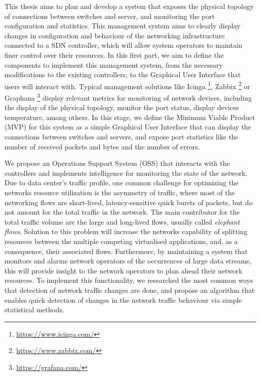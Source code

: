 This thesis aims to plan and develop a system that exposes the physical topology of connections between switches and server, and monitoring
the port configuration and statistics. This management system aims to clearly display changes in configuration and behaviour of the networking infrastructure
connected to a SDN controller, which will allow system operators to maintain finer control over their resources. In this first part, we aim to define the 
components to implement this management system, from the necessary modifications to the existing controllers, to the Graphical User Interface that users will 
interact with. Typical management solutions like Icinga \footnote{\url{https://www.icinga.com/}}, Zabbix \footnote{\url{https://www.zabbix.com/}} or
Graphana \footnote{\url{https://grafana.com/}} display relevant metrics for monitoring of network devices, including the display of the
physical topology, monitor the port status, display devices temperature, among others. In this stage, we define the Minimum Viable Product (MVP) for this system as a
simple Graphical User Interface that can display the connections between switches and servers, and expose port statistics like the number of received packets
and bytes and the number of errors.

\par We propose an Operations Support System (OSS) that interacts with the controllers and implements intelligence for monitoring the state of the network.
Due to data center's traffic profile, one common challenge for optimizing the networks resource utilization is the asymmetry of traffic, where most of the 
networking flows are short-lived, latency-sensitive quick bursts of packets, but do not amount for the total traffic in the network. The main contributor for the
total traffic volume are the large and long-lived flows, usually called \textit{elephant flows}.
Solution to this problem will increase the networks capability of splitting resources between the multiple competing virtualised applications, and, as a consequence,
their associated flows. Furthermore, by maintaining a system that monitors and alarms network operators of the occurrences of large data streams, this will provide
insight to the network operators to plan ahead their network resources. To implement this functionality, we researched the most common ways that detection of network
traffic changes are done, and propose an algorithm that enables quick detection of changes in the network traffic behaviour via simple statistical methods.

